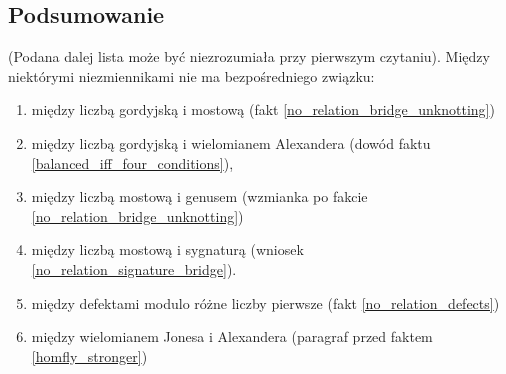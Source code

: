 \subsection{Podsumowanie}
(Podana dalej lista może być niezrozumiała przy pierwszym czytaniu).
Między niektórymi niezmiennikami nie ma bezpośredniego związku:
\begin{enumerate}
    \item między liczbą gordyjską i mostową (fakt \ref{no_relation_bridge_unknotting})
    \item między liczbą gordyjską i wielomianem Alexandera (dowód faktu \ref{balanced_iff_four_conditions}),
    \item między liczbą mostową i genusem (wzmianka po fakcie \ref{no_relation_bridge_unknotting})
    \item między liczbą mostową i sygnaturą (wniosek \ref{no_relation_signature_bridge}).
    \item między defektami modulo różne liczby pierwsze (fakt \ref{no_relation_defects})
    \item między wielomianem Jonesa i Alexandera (paragraf przed faktem \ref{homfly_stronger})
\end{enumerate}


